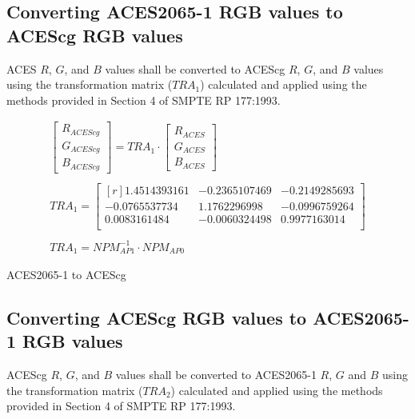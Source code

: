 \subsection{Converting ACES2065-1 RGB values to ACEScg RGB values}
\label{sec:aces2acescg}
ACES $R$, $G$, and $B$ values shall be converted to ACEScg $R$, $G$, and $B$ values using the transformation matrix ($TRA_{1}$) calculated and applied using the methods provided in Section 4 of SMPTE RP 177:1993.


\begin{floatequ} 
\begin{gather}
    \begin{bmatrix}
        R_{ACEScg}\\
        G_{ACEScg}\\
        B_{ACEScg}
    \end{bmatrix}
    =
    TRA_{1}
    \cdot
    \begin{bmatrix}
        R_{ACES}\\
        G_{ACES}\\
        B_{ACES}
    \end{bmatrix} \\
    \\
    TRA_{1} =
    \begin{bmatrix*}[r]
        1.4514393161 & -0.2365107469 & -0.2149285693 \\
       -0.0765537734 &  1.1762296998 & -0.0996759264 \\
        0.0083161484 & -0.0060324498 &  0.9977163014 \\
    \end{bmatrix*} \\
    \\
    TRA_{1} = NPM^{-1}_{AP1} \cdot NPM_{AP0}
\end{gather}
\caption{ACES2065-1 to ACEScg}
\label{eq:aces2acescg}
\end{floatequ}

\subsection{Converting ACEScg RGB values to ACES2065-1 RGB values}
ACEScg $R$, $G$, and $B$ values shall be converted to ACES2065-1 $R$, $G$ and $B$ using the transformation matrix ($TRA_{2}$) calculated and applied using the methods provided in Section 4 of SMPTE RP 177:1993.


